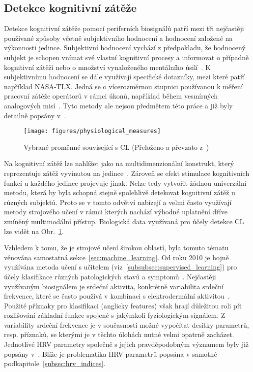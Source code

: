 \subsection{Detekce kognitivní zátěže}
\label{subsec:detekce_CL}
Detekce kognitivní zátěže pomocí periferních biosignálů patří mezi tři
nejčastěji používané způsoby včetně subjektivního hodnocení a hodnocení založené
na výkonnosti jedince. Subjektivní hodnocení vychází z předpokladu, že hodnocený
subjekt je schopen vnímat své vlastní kognitivní procesy a informovat o případně
kognitivní zátěží nebo o množství vynaloženého mentálního
úsilí~\cite{Wang2019,Schnotz2007}. K subjektivnímu hodnocení se dále využívají
specifické dotazníky, mezi které patří například NASA-TLX. Jedná se o
vícerozměrnou stupnici používanou k měření pracovní zátěže operátorů v rámci
úkonů, například během vesmírných analogových misí~\cite{Sandra2006}. Tyto
metody ale nejsou předmětem této práce a již byly detailně popsány
v~\cite{Schnotz2007}.

\begin{figure}[!htb]
    \begin{center}
        \texttt{[image: figures/physiological\_measures]}
        \caption{Vybrané proměnné související s \gls{CL} (Přeloženo a převzato
            z~\cite{Giannakakis2022})}
        \label{fig:physiological_measures}
    \end{center}
\end{figure}

Na kognitivní zátěž lze nahlížet jako na multidimenzionální konstrukt, který
reprezentuje zátěž vyvinutou na jedince~\cite{Wang2019}. Zároveň se efekt
stimulace kognitivních funkcí u každého jedince projevuje jinak. Nelze tedy
vytvořit žádnou univerzální metodu, která by byla schopná stejně spolehlivě
detekovat kognitivní zátěž u různých subjektů. Proto se v tomto odvětví nabízejí
a velmi často využívají metody strojového učení v rámci kterých nachází výhodné
uplatnění dříve zmíněný multimodální přístup. Biologická data využívaná pro
účely detekce \gls{CL} lze vidět na Obr.~\ref{fig:physiological_measures}.

Vzhledem k tomu, že je strojové učení širokou oblastí, byla tomuto tématu
věnována samostatná sekce~\ref{sec:machine_learning}. Od roku 2010 je hojně
využívána metoda učení s učitelem (viz~\ref{subsubsec:supervised_learning}) pro
účely klasifikace různých patologických stavů a symptomů~\cite{Ishaque2021}.
Nejčastěji využívaným biosignálem je srdeční aktivita, konkrétně variabilita
srdeční frekvence, které se často používá v kombinaci s elektrodermální
aktivitou~\cite{Wang2019}. Použité příznaky pro klasifikaci (anglicky features)
však hrají důležitou roli při rozlišování základní funkce spojené s jakýmkoli
fyziologickým signálem. Z variability srdeční frekvence je v současnosti možné
vypočítat desítky parametrů, resp. příznaků, se kterými je v těchto úlohách
nutné velmi opatrně zacházet. Jednotlivé \gls{HRV} parametry společně s jejich
pravděpodobným významem byly již popsány
v~\cite{Haapalainen2010,Rohila2020,Pham2021,Bouny2021}. Blíže je problematika
\gls{HRV} parametrů popsána v samotné podkapitole~\ref{subsec:hrv_indices}.

